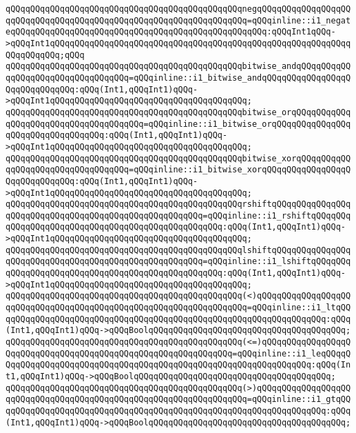 \verb|qQQqqQQqqQQqqQQqqQQqqQQqqQQqqQQqqQQqqQQqqQQqqQQqnegqQQqqQQqqQQqqQQqqQQqqQQqqQQqqQQqqQQqqQQqqQQqqQQqqQQqqQQqqQQqqQQqqQQq=qQQqinline::i1_negateqQQqqQQqqQQqqQQqqQQqqQQqqQQqqQQqqQQqqQQqqQQqqQQqqQQq:qQQqInt1qQQq->qQQqInt1qQQqqQQqqQQqqQQqqQQqqQQqqQQqqQQqqQQqqQQqqQQqqQQqqQQqqQQqqQQqqQQqqQQqqQQq;qQQq|\newline
\verb|qQQqqQQqqQQqqQQqqQQqqQQqqQQqqQQqqQQqqQQqqQQqqQQqbitwise_andqQQqqQQqqQQqqQQqqQQqqQQqqQQqqQQqqQQq=qQQqinline::i1_bitwise_andqQQqqQQqqQQqqQQqqQQqqQQqqQQqqQQq:qQQq(Int1,qQQqInt1)qQQq->qQQqInt1qQQqqQQqqQQqqQQqqQQqqQQqqQQqqQQqqQQqqQQq;|\newline
\verb|qQQqqQQqqQQqqQQqqQQqqQQqqQQqqQQqqQQqqQQqqQQqqQQqbitwise_orqQQqqQQqqQQqqQQqqQQqqQQqqQQqqQQqqQQqqQQq=qQQqinline::i1_bitwise_orqQQqqQQqqQQqqQQqqQQqqQQqqQQqqQQqqQQq:qQQq(Int1,qQQqInt1)qQQq->qQQqInt1qQQqqQQqqQQqqQQqqQQqqQQqqQQqqQQqqQQqqQQq;|\newline
\verb|qQQqqQQqqQQqqQQqqQQqqQQqqQQqqQQqqQQqqQQqqQQqqQQqbitwise_xorqQQqqQQqqQQqqQQqqQQqqQQqqQQqqQQqqQQq=qQQqinline::i1_bitwise_xorqQQqqQQqqQQqqQQqqQQqqQQqqQQqqQQq:qQQq(Int1,qQQqInt1)qQQq->qQQqInt1qQQqqQQqqQQqqQQqqQQqqQQqqQQqqQQqqQQqqQQq;|\newline
\verb|qQQqqQQqqQQqqQQqqQQqqQQqqQQqqQQqqQQqqQQqqQQqqQQqrshiftqQQqqQQqqQQqqQQqqQQqqQQqqQQqqQQqqQQqqQQqqQQqqQQqqQQqqQQq=qQQqinline::i1_rshiftqQQqqQQqqQQqqQQqqQQqqQQqqQQqqQQqqQQqqQQqqQQqqQQqqQQq:qQQq(Int1,qQQqInt1)qQQq->qQQqInt1qQQqqQQqqQQqqQQqqQQqqQQqqQQqqQQqqQQqqQQq;|\newline
\verb|qQQqqQQqqQQqqQQqqQQqqQQqqQQqqQQqqQQqqQQqqQQqqQQqlshiftqQQqqQQqqQQqqQQqqQQqqQQqqQQqqQQqqQQqqQQqqQQqqQQqqQQqqQQq=qQQqinline::i1_lshiftqQQqqQQqqQQqqQQqqQQqqQQqqQQqqQQqqQQqqQQqqQQqqQQqqQQq:qQQq(Int1,qQQqInt1)qQQq->qQQqInt1qQQqqQQqqQQqqQQqqQQqqQQqqQQqqQQqqQQqqQQq;|\newline
\verb|qQQqqQQqqQQqqQQqqQQqqQQqqQQqqQQqqQQqqQQqqQQqqQQq(<)qQQqqQQqqQQqqQQqqQQqqQQqqQQqqQQqqQQqqQQqqQQqqQQqqQQqqQQqqQQqqQQqqQQq=qQQqinline::i1_ltqQQqqQQqqQQqqQQqqQQqqQQqqQQqqQQqqQQqqQQqqQQqqQQqqQQqqQQqqQQqqQQqqQQq:qQQq(Int1,qQQqInt1)qQQq->qQQqBoolqQQqqQQqqQQqqQQqqQQqqQQqqQQqqQQqqQQqqQQq;|\newline
\verb|qQQqqQQqqQQqqQQqqQQqqQQqqQQqqQQqqQQqqQQqqQQqqQQq(<=)qQQqqQQqqQQqqQQqqQQqqQQqqQQqqQQqqQQqqQQqqQQqqQQqqQQqqQQqqQQqqQQq=qQQqinline::i1_leqQQqqQQqqQQqqQQqqQQqqQQqqQQqqQQqqQQqqQQqqQQqqQQqqQQqqQQqqQQqqQQqqQQq:qQQq(Int1,qQQqInt1)qQQq->qQQqBoolqQQqqQQqqQQqqQQqqQQqqQQqqQQqqQQqqQQqqQQq;|\newline
\verb|qQQqqQQqqQQqqQQqqQQqqQQqqQQqqQQqqQQqqQQqqQQqqQQq(>)qQQqqQQqqQQqqQQqqQQqqQQqqQQqqQQqqQQqqQQqqQQqqQQqqQQqqQQqqQQqqQQqqQQq=qQQqinline::i1_gtqQQqqQQqqQQqqQQqqQQqqQQqqQQqqQQqqQQqqQQqqQQqqQQqqQQqqQQqqQQqqQQqqQQq:qQQq(Int1,qQQqInt1)qQQq->qQQqBoolqQQqqQQqqQQqqQQqqQQqqQQqqQQqqQQqqQQqqQQq;|\newline
